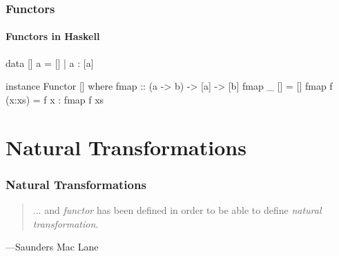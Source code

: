 \documentclass{beamer}
\begin{document}

\begin{frame}[fragile]
  \frametitle{Functors}
  \framesubtitle{Functors in Haskell}

  \begin{example}
    \begin{code}
data [] a = [] | a : [a]

instance Functor [] where
  fmap :: (a -> b) -> [a] -> [b]
  fmap _ []     = []
  fmap f (x:xs) = f x : fmap f xs
    \end{code}
  \end{example}

\end{frame}


\section{Natural Transformations}


\begin{frame}
  \frametitle{Natural Transformations}

  \begin{quote}
    ... and \emph{functor} has been defined in order to be able to
    define \emph{natural transformation}.
  \end{quote}
  \hfill ---Saunders Mac Lane

\end{frame}

\end{document}
